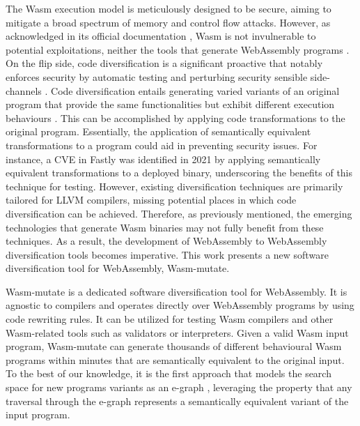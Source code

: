 \documentclass[sigplan,screen]{acmart}
\newcommand{\tool}{Wasm-mutate\xspace}
\newcommand{\wasm}{Wasm\xspace}
\newcommand{\Wasm}{WebAssembly\xspace}
\begin{document}
The \wasm execution model is meticulously designed to be secure, aiming to mitigate a broad spectrum of memory and control flow attacks.
However, as acknowledged in its official documentation \cite{WebAssemblySecurity}, \wasm is not invulnerable to potential exploitations, neither the tools that generate \Wasm programs \cite{usenixWASM2020, stievenart2021security}.
On the flip side, code diversification is a significant proactive that notably enforces security by automatic testing and perturbing security sensible side-channels \cite{arteaga2020crow, MEWE, CABRERAARTEAGA2023103296}.
Code diversification entails generating varied variants of an original program that provide the same functionalities but exhibit different execution behaviours \cite{cohen1993operating}.
This can be accomplished by applying code transformations to the original program.
Essentially, the application of semantically equivalent transformations to a program could aid in preventing security issues.
For instance, a CVE in Fastly was identified in 2021 \cite{CVE} by applying semantically equivalent transformations to a deployed binary, underscoring the benefits of this technique for testing.
However, existing diversification techniques are primarily tailored for LLVM compilers, missing potential places in which code diversification can be achieved.
Therefore, as previously mentioned, the emerging technologies that generate \wasm binaries may not fully benefit from these techniques.
As a result, the development of \Wasm to \Wasm diversification tools becomes imperative.
This work presents a new software diversification tool for \Wasm, \tool.


\tool is a dedicated software diversification tool for \Wasm.
It is agnostic to compilers and operates directly over \Wasm programs by using code rewriting rules.
It can be utilized for testing \wasm compilers and other \wasm-related tools such as validators or interpreters.
Given a valid Wasm input program, \tool can generate thousands of different behavioural \wasm programs within minutes that are semantically equivalent to the original input.
To the best of our knowledge, it is the first approach that models the search space for new programs variants as an e-graph \cite{10.1145/3434304}, leveraging the property that any traversal through the e-graph represents a semantically equivalent variant of the input program.
\end{document}
